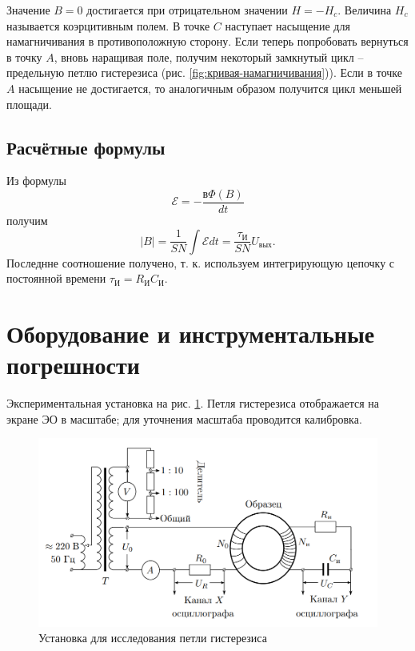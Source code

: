 \documentclass[a4paper]{article}
\newcommand{\picref}[1]{рис. \ref{#1}}
\begin{document}
Значение $ B = 0 $ достигается при отрицательном значении $ H = -H_c $. Величина $ H_c $ называется коэрцитивным полем. В точке $ C $ наступает насыщение для намагничивания в противоположную сторону.
Если теперь попробовать вернуться в точку $ A $, вновь наращивая поле, получим некоторый замкнутый цикл -- предельную петлю гистерезиса (\picref{fig:кривая-намагничивания})). Если в точке $ A $ насыщение не достигается, то аналогичным образом получится цикл меньшей площади.

\subsection{Расчётные формулы}

Из формулы 
\begin{equation*}\label{key}
	\mathscr{E} = - \frac{в \Phi (B)}{d t}
\end{equation*}
получим
\begin{equation}\label{key}
	\left|B\right| = \frac{1}{S N} \int \mathscr{E} d t = \frac{\tau_И}{S N} U_{вых}.
\end{equation}
Последнне соотношение получено, т. к. используем интегрирующую цепочку с постоянной времени $ \tau_И = R_И C_И $.

\section{Оборудование и инструментальные погрешности}

Экспериментальная установка на \picref{fig:установка}. Петля гистерезиса отображается на экране ЭО в масштабе; для уточнения масштаба проводится калибровка.

\begin{figure}[tbp]
	\centering
	\includegraphics[width=0.8\linewidth]{установка}
	\caption{Установка для исследования петли гистерезиса}
	\label{fig:установка}
\end{figure}
\end{document}
